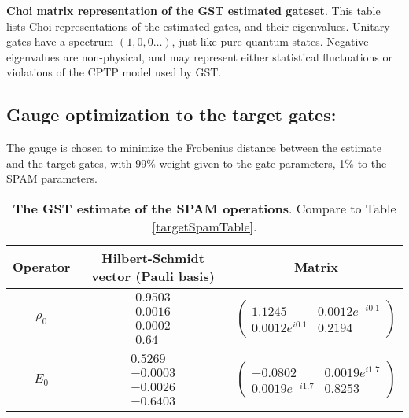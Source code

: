 {\begin{table}[h]
\begin{center}
\caption{\textbf{Choi matrix representation of the GST estimated gateset}.  This table lists Choi representations of the estimated gates, and their eigenvalues.  Unitary gates have a spectrum $(1,0,0\ldots)$, just like pure quantum states.  Negative eigenvalues are non-physical, and may represent either statistical fluctuations or violations of the CPTP model used by GST.\label{bestTargetSpamGatesetChoiTable}}
\end{center}
\end{table}

\clearpage

\subsection{Gauge optimization to the target gates:}
The gauge is chosen to minimize the Frobenius distance between the estimate and the target gates, with 99\% weight given to the gate parameters, 1\% to the SPAM parameters.


\begin{table}[h]
\begin{center}
\begin{tabular}[l]{|c|c|c|}
\hline
Operator & Hilbert-Schmidt vector (Pauli basis) & Matrix \\ \hline
$\rho_{0}$ & $ \begin{array}{c}
0.9503 \\ 
0.0016 \\ 
0.0002 \\ 
0.64
 \end{array} $
 & $ \left(\!\!\begin{array}{cc}
1.1245 & 0.0012e^{-i0.1} \\ 
0.0012e^{i0.1} & 0.2194
 \end{array}\!\!\right) $
 \\ \hline
$E_{0}$ & $ \begin{array}{c}
0.5269 \\ 
-0.0003 \\ 
-0.0026 \\ 
-0.6403
 \end{array} $
 & $ \left(\!\!\begin{array}{cc}
-0.0802 & 0.0019e^{i1.7} \\ 
0.0019e^{-i1.7} & 0.8253
 \end{array}\!\!\right) $
 \\ \hline
\end{tabular}

\caption{\textbf{The GST estimate of the SPAM operations}.  Compare to Table \ref{targetSpamTable}.\label{bestTargetGatesGatesetSpamTable}}
\end{center}
\end{table}

}
